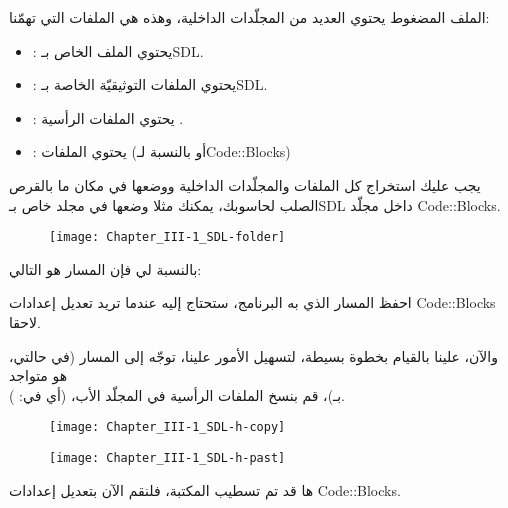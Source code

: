 الملف المضغوط يحتوي العديد من المجلّدات الداخلية، وهذه هي الملفات التي تهمّنا:

\begin{itemize}
	\item {}:
	يحتوي الملف 
	الخاص بـ\textenglish{SDL}.
	\item {}:
	يحتوي الملفات التوثيقيّة الخاصة بـ\textenglish{SDL}.
	\item {}:
	يحتوي الملفات الرأسية
	.
	\item {}:
	يحتوي الملفات 
	(أو
	بالنسبة لـ\textenglish{Code::Blocks})
\end{itemize}

يجب عليك استخراج كل الملفات والمجلّدات الداخلية ووضعها في مكان ما بالقرص الصلب لحاسوبك، يمكنك مثلا وضعها في مجلد خاص بـ\textenglish{SDL}
داخل مجلّد \textenglish{Code::Blocks}.

\begin{figure}[H]
	\centering
	\texttt{[image: Chapter\_III-1\_SDL-folder]}
\end{figure}


بالنسبة لي فإن المسار هو التالي:


احفظ المسار الذي به البرنامج، ستحتاج إليه عندما تريد تعديل إعدادات 
\textenglish{Code::Blocks}
لاحقا.

والآن، علينا بالقيام بخطوة بسيطة، لتسهيل الأمور علينا، توجّه إلى المسار
(في حالتي، هو متواجد\\
بـ)،
قم بنسخ الملفات الرأسية
 في المجلّد الأب، (أي في:
).

\begin{figure}[H]
	\centering
	\texttt{[image: Chapter\_III-1\_SDL-h-copy]}
\end{figure}
\begin{figure}[H]
	\centering
	\texttt{[image: Chapter\_III-1\_SDL-h-past]}
\end{figure}

ها قد تم تسطيب المكتبة، فلنقم الآن بتعديل إعدادات
\textenglish{Code::Blocks}.

